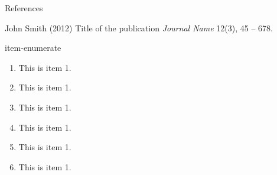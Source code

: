 \documentclass[aspectratio=169,xcolor=dvipsnames]{beamer}
\begin{document}

\begin{frame}{References}
    \footnotesize{
        \begin{thebibliography}{99}
             John Smith (2012)
            \newblock Title of the publication
            \newblock \emph{Journal Name} 12(3), 45 -- 678.
        \end{thebibliography}
    }
\end{frame}


\begin{frame}{item-enumerate}
\begin{enumerate}
	\item This is item 1.
	\vspace*{1em}
	\item This is item 1.
	\vspace*{1em}
	\item This is item 1.
	\vspace*{1em}
	\item This is item 1.
	\vspace*{1em}
	\item This is item 1.
	\vspace*{1em}
	\item This is item 1.
\end{enumerate}
\end{frame}
\end{document}
